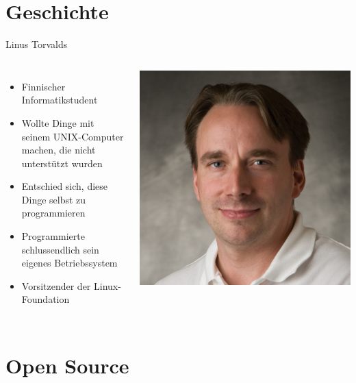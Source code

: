\documentclass[10pt]{beamer}
\begin{document}
\section{Geschichte}
\begin{frame}{Linus Torvalds}
	\begin{columns}
		 	\begin{itemize}[<+- | alert@+>]
		 		\item Finnischer Informatikstudent
		 		\item Wollte Dinge mit seinem UNIX-Computer machen, die nicht unterstützt wurden
		 		\item Entschied sich, diese Dinge selbst zu programmieren
		 		\item Programmierte schlussendlich sein eigenes Betriebssystem
		 		\item Vorsitzender der Linux-Foundation
		 	\end{itemize}
	 		\includegraphics[scale=0.25]{img/torvalds.png}
	\end{columns}
\end{frame}

\section{Open Source}
\end{document}
